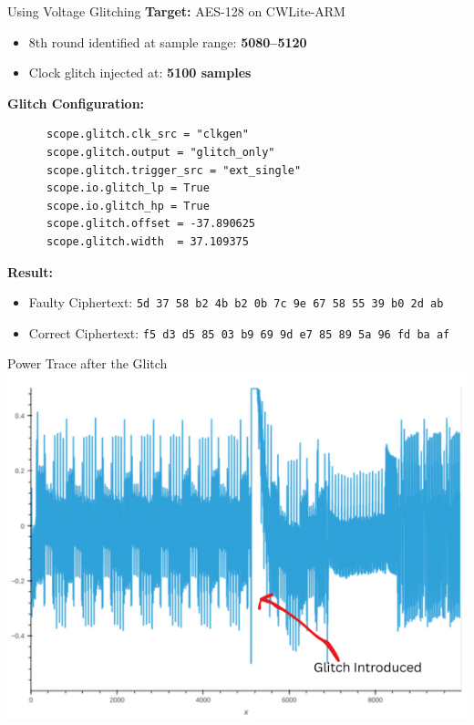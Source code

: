 \documentclass{beamer}
\newenvironment{tres important}[2][]{
	\setkeys{EmphEqEnv}{#2}
	\setkeys{EmphEqOpt}{box={\setlength{\fboxsep}{10pt}\fcolorbox{myNewColorA}{white}},#1}
	\EmphEqMainEnv}
{\endEmphEqMainEnv}
\begin{document}
\begin{frame}[fragile]{Using Voltage Glitching}
    \textbf{Target:} AES-128 on CWLite-ARM
    
    \vspace{1mm}
    \begin{itemize}
      \item 8th round identified at sample range: \textbf{5080–5120}
      \item Clock glitch injected at: \textbf{5100 samples}
    \end{itemize}
    
    \textbf{Glitch Configuration:}
    \vspace{1mm}
    
    \begin{lstlisting}
      scope.glitch.clk_src = "clkgen"
      scope.glitch.output = "glitch_only"
      scope.glitch.trigger_src = "ext_single"
      scope.io.glitch_lp = True
      scope.io.glitch_hp = True
      scope.glitch.offset = -37.890625
      scope.glitch.width  = 37.109375
    \end{lstlisting}
    
    \textbf{Result:}
    \begin{itemize}
      \item Faulty Ciphertext: \texttt{5d 37 58 b2 4b b2 0b 7c 9e 67 58 55 39 b0 2d ab}
      \item Correct Ciphertext: \texttt{f5 d3 d5 85 03 b9 69 9d e7 85 89 5a 96 fd ba af}
    \end{itemize}
    \end{frame}
    \begin{frame}[fragile]{Power Trace after the Glitch}
      \centering
      \includegraphics[width=0.7\linewidth]{images/3.png}
      \caption{Power Trace of AES 128 after the Glitch Using CWLite ARM}
    \end{frame}
\end{document}
